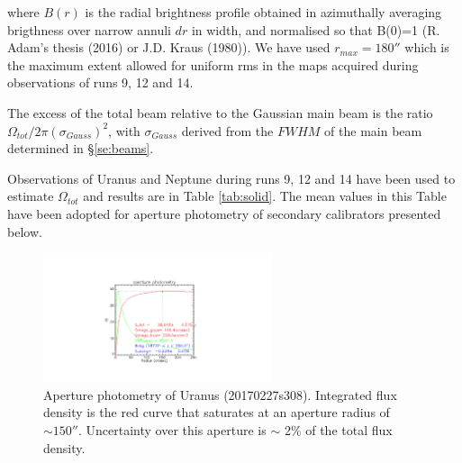 \noindent where $B(r)$ is the radial brightness profile obtained in azimuthally averaging brigthness over narrow annuli
$dr$ in width, and normalised so that B(0)=1 (R. Adam's thesis (2016) or J.D. Kraus (1980)).
We have used $r_{max}=180''$ which is the maximum extent allowed for uniform rms in the maps acquired during observations of runs 9, 12 and 14.

The excess of the total beam relative to the Gaussian main beam is the ratio
$\Omega_{tot} / 2 \pi (\sigma_{Gauss})^2$, with  $\sigma_{Gauss}$ derived from the $FWHM$ of the main beam determined
in \S \ref{se:beams}.

Observations of Uranus and Neptune during runs 9, 12 and 14 have been used to estimate $\Omega_{tot}$ and results
are in Table \ref{tab:solid}. The mean values in this Table have been adopted for aperture photometry of secondary calibrators presented below.  



\begin{figure}[ht!]
  \begin{center}
    \includegraphics[clip=true,width=0.6\textwidth, trim={8cm, 3cm, 8cm, 4cm}]{Figures/Aperture_photo/Uranus_s308_A1.pdf}
    \caption{Aperture photometry of Uranus (20170227s308). Integrated flux density is the red curve that
saturates at an aperture radius of $ \sim 150''$. Uncertainty over this aperture is $\sim$ 2\% of the total flux density.}
    \label{fig:Uranus_s308}
  \end{center}
\end{figure}


